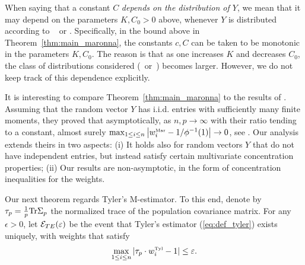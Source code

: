 \documentclass[times,sort&compress,3p]{elsarticle}
\newcommand{\Revision}[1]{{#1}}
\begin{document}
\begin{remark}
    When saying that a constant $C$ \emph{  depends on the distribution of $Y$}, we mean that it may depend on the parameters $K,C_0>0$ above, whenever $Y$ is distributed according to  \AssumIndep~ or \AssumCCPSB. \Revision{
    Specifically, in the bound above in Theorem~\ref{thm:main_maronna}, the constants $c,C$ can be taken to be monotonic in the parameters $K,C_0$. The reason is that as one increases $K$ and decreases $C_0$, the class of distributions considered (\AssumIndep~or~\AssumLC) becomes larger.
    However, we do not keep track of this dependence explicitly.
    }
\end{remark}


It is interesting to compare Theorem~\ref{thm:main_maronna} to the results of \cite{couillet2014robust}.
Assuming that 
the random vector $Y$ has i.i.d. entries with sufficiently many finite moments,
they proved that asymptotically, as $n,p\to\infty$ 
with their ratio tending to a constant, almost surely $\max_{1\le i \le n}\left|w^{\mbox{\tiny{Mar}}}_i-1/\phi^{-1}(1)\right|\to 0$, see \cite[Eq. (6)]{couillet2014robust}.
Our analysis extends theirs in two aspects: (i) It holds also for random vectors $Y$ that do not have independent entries, but instead satisfy certain multivariate concentration properties;  (ii) Our results are non-asymptotic, in the form of concentration inequalities for the weights.

Our next theorem regards Tyler's M-estimator. 
To this end, denote by $\tau_p = \frac{1}{p}\textrm{Tr}\Sigma_p$ the normalized trace of the population covariance matrix. For any  $\epsilon>0$, let  $\mathcal{E}_{TE}(\varepsilon)$ be the event that Tyler's estimator (\ref{eq:def_tyler}) exists uniquely, 
with weights that satisfy 
\begin{equation}\label{eq:main-tyler-weights}
    \max_{1\le i \le n} \left|\tau_p \cdot w^{\mbox{\tiny{Tyl}}}_i-1\right| \le \varepsilon .
\end{equation}
\end{document}
